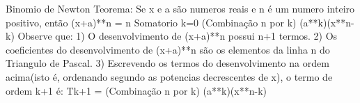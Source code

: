 Binomio de Newton
Teorema: Se x e a são numeros reais e n é um numero inteiro positivo, então
    (x+a)**n = n Somatorio k=0 (Combinação n por k) (a**k)(x**n-k)
Observe que:
 1) O desenvolvimento de (x+a)**n possui n+1 termos.
 2) Os coeficientes do desenvolvimento de (x+a)**n são os elementos da linha n 
    do Triangulo de Pascal. 
 3) Escrevendo os termos do desenvolvimento na ordem acima(isto é, ordenando 
    segundo as potencias decrescentes de x), o termo de ordem k+1 é:
        Tk+1 = (Combinação n por k) (a**k)(x**n-k)